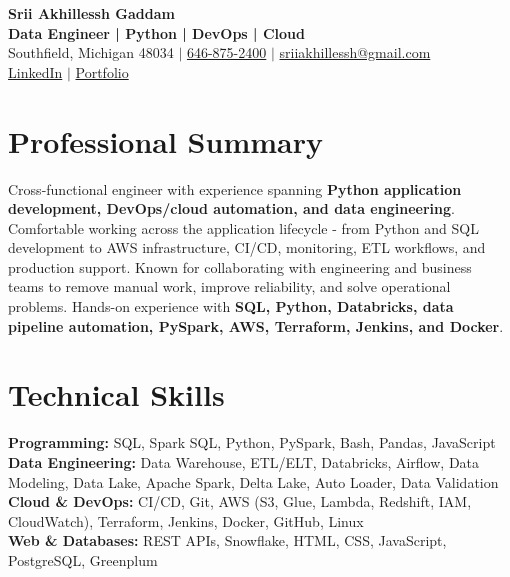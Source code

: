\documentclass[letterpaper,10pt]{article}
\begin{document}
\fontsize{9.35pt}{10.45pt}\selectfont

\begin{center}
    {\LARGE \textbf{Srii Akhillessh Gaddam}} \\[-1pt]
    \textbf{Data Engineer | Python | DevOps | Cloud} \\[2pt]
    Southfield, Michigan 48034 $|$
    \href{tel:6468752400}{646-875-2400} $|$
    \href{mailto:sriiakhillessh@gmail.com}{sriiakhillessh@gmail.com} \\[1pt]
    \href{https://www.linkedin.com/in/srii-akhiilessh-gaddam-b48668191/}{LinkedIn} $|$
    \href{https://sriiakhillesshg.github.io/portfolio/}{Portfolio}
\end{center}
\vspace{-8pt}

\section{Professional Summary}
\small{Cross-functional engineer with experience spanning \textbf{Python application development, DevOps/cloud automation, and data engineering}. Comfortable working across the application lifecycle - from Python and SQL development to AWS infrastructure, CI/CD, monitoring, ETL workflows, and production support. Known for collaborating with engineering and business teams to remove manual work, improve reliability, and solve operational problems. Hands-on experience with \textbf{SQL, Python, Databricks, data pipeline automation, PySpark, AWS, Terraform, Jenkins, and Docker}.}

\section{Technical Skills}
\small{
\textbf{Programming:} SQL, Spark SQL, Python, PySpark, Bash, Pandas, JavaScript \\
\textbf{Data Engineering:} Data Warehouse, ETL/ELT, Databricks, Airflow, Data Modeling, Data Lake, Apache Spark, Delta Lake, Auto Loader, Data Validation \\
\textbf{Cloud \& DevOps:} CI/CD, Git, AWS (S3, Glue, Lambda, Redshift, IAM, CloudWatch), Terraform, Jenkins, Docker, GitHub, Linux \\
\textbf{Web \& Databases:} REST APIs, Snowflake, HTML, CSS, JavaScript, PostgreSQL, Greenplum
}
\end{document}
